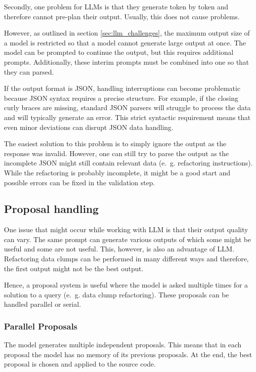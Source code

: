 Secondly, one problem for \acp{LLM} is that they generate token by token and therefore cannot pre-plan their output. Usually, this does not cause problems. 

However, as outlined in section \ref{sec:llm_challenges}, the maximum output size of a model is restricted so that a model cannot generate large output at once. The model can be prompted to continue the output, but this requires additional prompts. Additionally, these interim prompts must be combined into one so that they can parsed.

If the output format is \ac{JSON}, handling interruptions can become problematic because \ac{JSON} syntax requires a precise structure. For example, if the closing curly braces are missing, standard \ac{JSON} parsers will struggle to process the data and will typically generate an error. This strict syntactic requirement means that even minor deviations can disrupt \ac{JSON} data handling.

The easiest solution to this problem is to simply ignore the output as the response was invalid. 
However,  one can still try to parse the output as the incomplete \ac{JSON} might still contain relevant data (e.~g. refactoring instructions). While the refactoring is probably incomplete, it might be a good start and possible errors can be fixed in the validation step.


\subsection{Proposal handling}

One issue that might occur while working with \ac{LLM} is that their output quality can vary. The same prompt can generate various outputs of which some might be useful and some are not useful. This, however, is also an advantage of \acs{LLM}. Refactoring data clumps can be performed in many different ways and therefore, the first output might not be the best output. 

Hence, a proposal system is useful where the model is asked multiple times for a solution to a query (e.~g. data clump refactoring). These proposals can be handled parallel or serial.  

\subsubsection{Parallel Proposals}
The model generates multiple independent proposals. This means that in each proposal the model has no memory of its previous proposals. At the end, the best proposal is chosen and applied to the source code.

